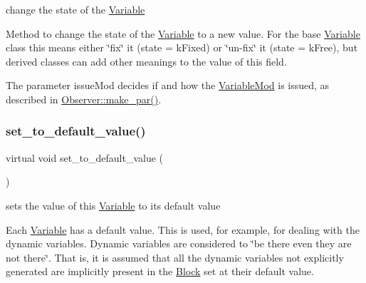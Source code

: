 change the state of the \mbox{\hyperlink{class_s_m_spp__di__unipi__it_1_1_variable}{Variable}} 

Method to change the state of the \mbox{\hyperlink{class_s_m_spp__di__unipi__it_1_1_variable}{Variable}} to a new value. For the base \mbox{\hyperlink{class_s_m_spp__di__unipi__it_1_1_variable}{Variable}} class this means either \char`\"{}fix\char`\"{} it (state = k\+Fixed) or \char`\"{}un-\/fix\char`\"{} it (state = k\+Free), but derived classes can add other meanings to the value of this field.

The parameter issue\+Mod decides if and how the \mbox{\hyperlink{class_s_m_spp__di__unipi__it_1_1_variable_mod}{Variable\+Mod}} is issued, as described in \mbox{\hyperlink{class_s_m_spp__di__unipi__it_1_1_observer_a2d499ae38e5e95cf66cd71da32b0694a}{Observer\+::make\+\_\+par()}}. \mbox{\label{class_s_m_spp__di__unipi__it_1_1_variable_af5d1aa1e79219b323968cf33d689f474}} 
\subsubsection{\texorpdfstring{set\+\_\+to\+\_\+default\+\_\+value()}{set\_to\_default\_value()}}
{\footnotesize\ttfamily virtual void set\+\_\+to\+\_\+default\+\_\+value (\begin{DoxyParamCaption}\item[{void}]{ }\end{DoxyParamCaption})\hspace{0.3cm}{\ttfamily [pure virtual]}}



sets the value of this \mbox{\hyperlink{class_s_m_spp__di__unipi__it_1_1_variable}{Variable}} to its default value 

Each \mbox{\hyperlink{class_s_m_spp__di__unipi__it_1_1_variable}{Variable}} has a default value. This is used, for example, for dealing with the dynamic variables. Dynamic variables are considered to \char`\"{}be there even they are not there\char`\"{}. That is, it is assumed that all the dynamic variables not explicitly generated are implicitly present in the \mbox{\hyperlink{class_s_m_spp__di__unipi__it_1_1_block}{Block}} set at their default value. 

